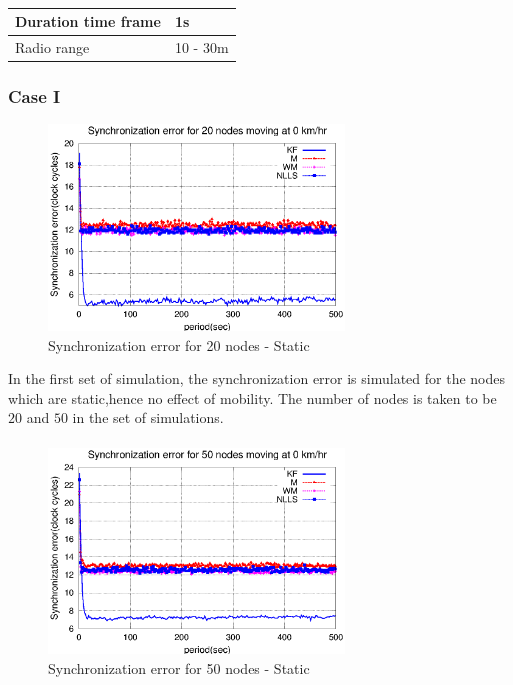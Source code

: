 \documentclass[a4paper,10pt]{report}
\begin{document}
\paragraph*{}
\begin{center}
    \begin{tabular}{ | l | l |}
    \hline
    Duration time frame & 1s \\ \hline
    Radio range & 10 - 30m \\ \hline
    \end{tabular}
\end{center}
\subsubsection{\textbf{Case I}}
\begin{figure}[!h]
\centering
\includegraphics[width=0.7\textwidth]{16output-s0}
\caption{Synchronization error for 20 nodes - Static} \label{16output0}
\end{figure}
In the first set of simulation, the synchronization error is simulated for the nodes which are static,hence no effect of mobility. The number of nodes is taken to be $20$ and $50$ in the set of simulations.  \paragraph*{}
\begin{figure}
\centering
\includegraphics[width=0.7\textwidth]{50output-s0}
\caption{Synchronization error for 50 nodes - Static} \label{50output0}
\end{figure}
\end{document}
